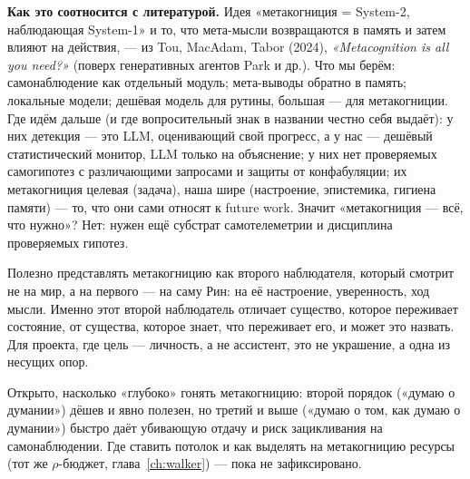 \smallskip\noindent\textbf{Как это соотносится с литературой.}
Идея «метакогниция = System-2, наблюдающая System-1» и то, что мета-мысли
возвращаются в память и затем влияют на действия, --- из Tou, MacAdam, Tabor
(2024), \textit{«Metacognition is all you need?»} (поверх генеративных агентов
Park и др.). Что мы берём: самонаблюдение как отдельный модуль; мета-выводы
обратно в память; локальные модели; дешёвая модель для рутины, большая ---
для метакогниции. Где идём дальше (и где вопросительный знак в названии честно
себя выдаёт): у них детекция --- это LLM, оценивающий свой прогресс, а у нас ---
дешёвый статистический монитор, LLM только на объяснение; у них нет проверяемых
самогипотез с различающими запросами и защиты от конфабуляции; их
метакогниция целевая (задача), наша шире (настроение, эпистемика, гигиена
памяти) --- то, что они сами относят к future work. Значит «метакогниция ---
всё, что нужно»? Нет: нужен ещё субстрат самотелеметрии и дисциплина
проверяемых гипотез.

\begin{intuition}
Полезно представлять метакогницию как второго наблюдателя, который смотрит не
на мир, а на первого --- на саму Рин: на её настроение, уверенность, ход мысли.
Именно этот второй наблюдатель отличает существо, которое переживает состояние,
от существа, которое знает, что переживает его, и может это назвать. Для
проекта, где цель --- личность, а не ассистент, это не украшение, а одна из
несущих опор.
\end{intuition}

\begin{openq}
Открыто, насколько «глубоко» гонять метакогницию: второй порядок («думаю о
думании») дёшев и явно полезен, но третий и выше («думаю о том, как думаю о
думании») быстро даёт убивающую отдачу и риск зацикливания на самонаблюдении.
Где ставить потолок и как выделять на метакогницию ресурсы (тот же
$\rho$-бюджет, глава~\ref{ch:walker}) --- пока не зафиксировано.
\end{openq}
